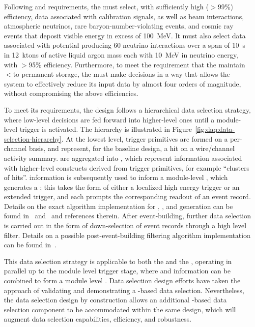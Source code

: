 Following   and  requirements, the
 must select, with sufficiently high ($>$99\%) efficiency, data associated with calibration
signals, as well as beam interactions,
atmospheric neutrinos, rare baryon-number-violating events, and cosmic
ray events that deposit visible energy in excess of \SI{100}{\MeV}. 
It must also select data associated with potential
 producing 60 neutrino interactions over a span of \SI{10}{\second} in 12~ktons of active
liquid argon mass each with \SI{10}{\MeV} in neutrino energy, with $>$95\% efficiency. 
Furthermore, to meet the requirement that the   maintain
$<$\offsitepbpy to permanent storage, the 
must make  decisions in a way that allows the  
system to effectively reduce its input data by almost four orders of magnitude,
without compromising the above efficiencies.

To meet its requirements, the  design follows a hierarchical data selection strategy, 
where low-level decisions are fed forward into higher-level ones until a module-level trigger is activated. 
The hierarchy is illustrated in
Figure~\ref{fig:daq:data-selection-hierarchy}. 
At the lowest level, trigger primitives are formed on a per-channel basis, and represent, for the baseline design, a hit on a wire/channel activity summary. 
 are aggregated into , which represent information associated with higher-level constructs derived from trigger primitives, for example ``clusters of hits''. 
 information is subsequently used to inform a
module-level , which generates a ;
this takes the form of either a localized high energy trigger or an
extended  trigger, and each prompts the corresponding readout of an
event record. Details on the
exact algorithm implementation for , , and  generation can be found
in~ and~ and references therein. 
After event-building, further data selection is carried out in the form
of down-selection of event records through a high level
filter. Details on a possible post-event-building filtering algorithm
implementation can be found in~.

This data selection strategy is applicable to both the  and
the , operating in parallel up to the module level trigger stage, where  and  information can be combined to form a module level . 
Data selection design efforts have taken the approach of validating
and demonstrating a -based data selection. Nevertheless,
the data selection design by construction allows an additional
-based data selection component to be accommodated within
the same design, which will augment data selection capabilities, efficiency, and robustness.

